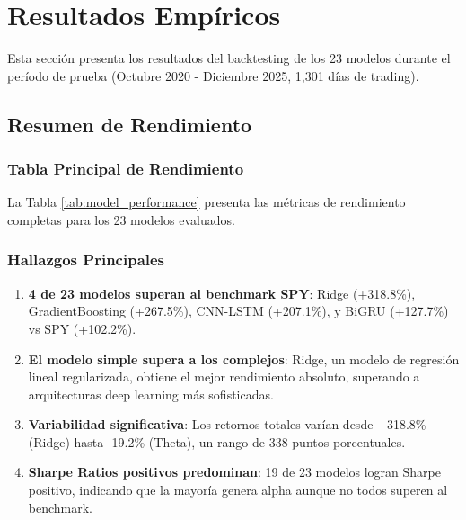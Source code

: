 
\section{Resultados Emp\'iricos}
\label{sec:empirical_results}

Esta secci\'on presenta los resultados del backtesting de los 23 modelos durante el per\'iodo de prueba (Octubre 2020 - Diciembre 2025, 1,301 d\'ias de trading).

\subsection{Resumen de Rendimiento}
\label{subsec:performance_summary}

\subsubsection{Tabla Principal de Rendimiento}

La Tabla \ref{tab:model_performance} presenta las m\'etricas de rendimiento completas para los 23 modelos evaluados.



\subsubsection{Hallazgos Principales}

\begin{enumerate}
    \item \textbf{4 de 23 modelos superan al benchmark SPY}: Ridge (+318.8\%), GradientBoosting (+267.5\%), CNN-LSTM (+207.1\%), y BiGRU (+127.7\%) vs SPY (+102.2\%).

    \item \textbf{El modelo simple supera a los complejos}: Ridge, un modelo de regresi\'on lineal regularizada, obtiene el mejor rendimiento absoluto, superando a arquitecturas deep learning m\'as sofisticadas.

    \item \textbf{Variabilidad significativa}: Los retornos totales var\'ian desde +318.8\% (Ridge) hasta -19.2\% (Theta), un rango de 338 puntos porcentuales.

    \item \textbf{Sharpe Ratios positivos predominan}: 19 de 23 modelos logran Sharpe positivo, indicando que la mayor\'ia genera alpha aunque no todos superen al benchmark.
\end{enumerate}

